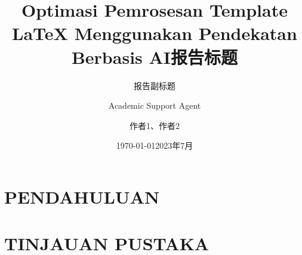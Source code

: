\documentclass{beamer}
\title{Optimasi Pemrosesan Template LaTeX Menggunakan Pendekatan Berbasis AI}
\author{Academic Support Agent}
\date{\today}
\begin{document}
\maketitle

\begin{abstract}

\end{abstract}

\chapter{PENDAHULUAN}


\chapter{TINJAUAN PUSTAKA}


\usepackage{amsfonts,amsmath,oldgerm}
\usepackage{xeCJK}

\newcommand{\testcolor}[1]{\colorbox{#1}{\textcolor{#1}{test}}~\texttt{#1}}



\newcommand{\hrefcol}[2]{\textcolor{cyan}{\href{#1}{#2}}}

\title{报告标题}
\subtitle{报告副标题}
\author{作者1、作者2}
\date{2023年7月}
\end{document}
